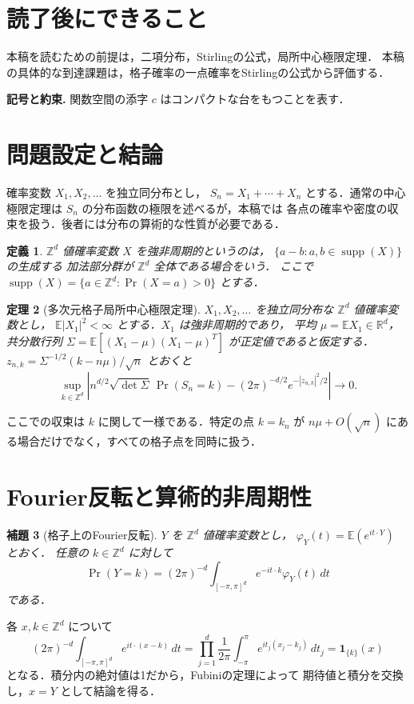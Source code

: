 \documentclass[a5paper,10pt,onecolumn]{jsarticle}
\makeatletter
\theoremstyle{mathnotetheorem}
\newtheorem{theorem}{定理}[section]
\newtheorem{definition}[theorem]{定義}
\newtheorem{lemma}[theorem]{補題}
\renewcommand{\proofname}{証明}
\renewenvironment{proof}[1][\proofname]{%
  \par\pushQED{\qed}\normalfont\topsep4\p@\@plus2\p@\relax
  \trivlist\item[\hskip\labelsep\bfseries #1]\ignorespaces
}{\popQED\endtrivlist\@endpefalse}
\makeatother
\begin{document}
\section*{読了後にできること}
本稿を読むための前提は，二項分布，Stirlingの公式，局所中心極限定理．
本稿の具体的な到達課題は，格子確率の一点確率をStirlingの公式から評価する．


\par\noindent\textbf{記号と約束.}\quad
関数空間の添字 $c$ はコンパクトな台をもつことを表す．
\par

\section{問題設定と結論}
確率変数 $X_1,X_2,\ldots$ を独立同分布とし，
$S_n=X_1+\cdots+X_n$ とする．通常の中心極限定理は
$S_n$ の分布函数の極限を述べるが，本稿では
各点の確率や密度の収束を扱う．後者には分布の算術的な性質が必要である．

\begin{definition}
$\mathbb Z^d$ 値確率変数 $X$ を\emph{強非周期的}というのは，
$\{a-b:a,b\in\operatorname{supp}(X)\}$ の生成する
加法部分群が $\mathbb Z^d$ 全体である場合をいう．
ここで $\operatorname{supp}(X)=\{a\in\mathbb Z^d:\Pr(X=a)>0\}$ とする．
\end{definition}

\begin{theorem}[多次元格子局所中心極限定理]\label{thm:llclt}
$X_1,X_2,\ldots$ を独立同分布な $\mathbb Z^d$ 値確率変数とし，
$\mathbb E|X_1|^2<\infty$ とする．$X_1$ は強非周期的であり，
平均 $\mu=\mathbb E X_1\in\mathbb R^d$，共分散行列
$\Sigma=\mathbb E[(X_1-\mu)(X_1-\mu)^T]$ が正定値であると仮定する．
$z_{n,k}=\Sigma^{-1/2}(k-n\mu)/\sqrt n$ とおくと
\[
 \sup_{k\in\mathbb Z^d}\left|
 n^{d/2}\sqrt{\det\Sigma}\,\Pr(S_n=k)
 -(2\pi)^{-d/2}e^{-|z_{n,k}|^2/2}
 \right|\longrightarrow0.
\]
\end{theorem}

ここでの収束は $k$ に関して一様である．特定の点 $k=k_n$ が
$n\mu+O(\sqrt n)$ にある場合だけでなく，すべての格子点を同時に扱う．

\section{Fourier反転と算術的非周期性}
\begin{lemma}[格子上のFourier反転]\label{lem:inv}
$Y$ を $\mathbb Z^d$ 値確率変数とし，
$\varphi_Y(t)=\mathbb E(e^{it\cdot Y})$ とおく．
任意の $k\in\mathbb Z^d$ に対して
\[
 \Pr(Y=k)=(2\pi)^{-d}\int_{[-\pi,\pi]^d}
             e^{-it\cdot k}\varphi_Y(t)\,dt
\]
である．
\end{lemma}
\begin{proof}
各 $x,k\in\mathbb Z^d$ について
\[
 (2\pi)^{-d}\int_{[-\pi,\pi]^d}e^{it\cdot(x-k)}\,dt
 =\prod_{j=1}^d\frac1{2\pi}\int_{-\pi}^{\pi}
         e^{it_j(x_j-k_j)}\,dt_j
 =\mathbf1_{\{k\}}(x)
\]
となる．積分内の絶対値は1だから，Fubiniの定理によって
期待値と積分を交換し，$x=Y$ として結論を得る．
\end{proof}
\end{document}
